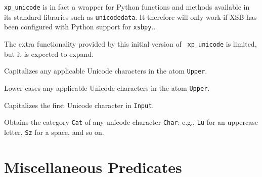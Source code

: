 {\tt xp\_unicode} is in fact a wrapper for Python functions and
methods available in its standard libraries such as {\tt unicodedata}.
It therefore will only work if XSB has been configured with Python
support for {\tt xsbpy}..

The extra functionality provided by this initial version of {\tt
  xp\_unicode} is limited, but it is expected to expand.

\begin{description}

  Capitalizes any applicable Unicode characters in the atom {\tt Upper}.

  Lower-cases any applicable Unicode characters in the atom {\tt Upper}.

Capitalizes the first Unicode character in {\tt Input}.

Obtains the category {\tt Cat} of any unicode character {\tt Char}:
e.g., {\tt Lu} for an uppercase letter, {\tt Sz} for a space, and so on.

\end{description}

\section{Miscellaneous Predicates}

